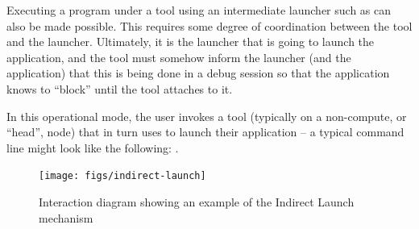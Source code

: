 Executing a program under a tool using an intermediate launcher such as  can also be made possible. This requires some degree of coordination between the tool and the launcher. Ultimately, it is the launcher that is going to launch the application, and the tool must somehow inform the launcher (and the application) that this is being done in a debug session so that the application knows to ``block'' until the tool attaches to it.

In this operational mode, the user invokes a tool (typically on a non-compute, or ``head'', node) that in turn uses  to launch their application – a typical command line might look like the following: .

\begingroup
\begin{figure}
  \begin{center}
    \texttt{[image: figs/indirect-launch]}
  \end{center}
  \caption{Interaction diagram showing an example of the Indirect Launch mechanism}
  \label{fig:indirect_launch}
\end{figure}
\endgroup



{\large {}}

{\large {}}

{\large {}}

{\large {}}

{\large {}}

{\large {}}

{\large {}}




